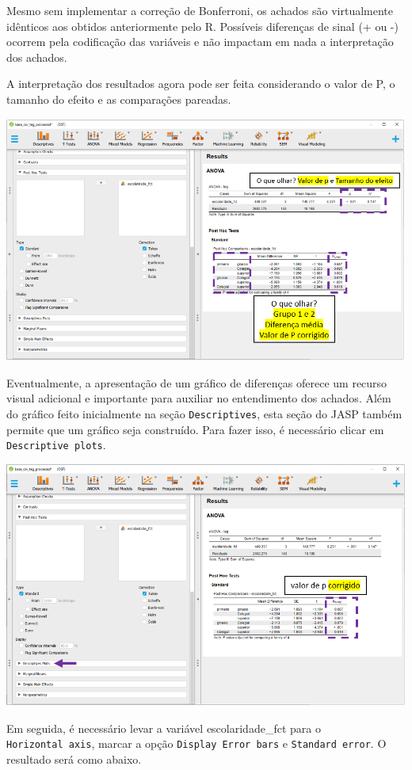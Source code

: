 \documentclass[
]{book}
\begin{document}
Mesmo sem implementar a correção de Bonferroni, os achados são virtualmente idênticos aos obtidos anteriormente pelo R. Possíveis diferenças de sinal (+ ou -) ocorrem pela codificação das variáveis e não impactam em nada a interpretação dos achados.

A interpretação dos resultados agora pode ser feita considerando o valor de P, o tamanho do efeito e as comparações pareadas.

\includegraphics{./img/cap_anova_posthoc_resultados2.png}

Eventualmente, a apresentação de um gráfico de diferenças oferece um recurso visual adicional e importante para auxiliar no entendimento dos achados. Além do gráfico feito inicialmente na seção \texttt{Descriptives}, esta seção do JASP também permite que um gráfico seja construído. Para fazer isso, é necessário clicar em \texttt{Descriptive\ plots}.

\includegraphics{./img/cap_anova_posthoc_plots.png}

Em seguida, é necessário levar a variável escolaridade\_fct para o \texttt{Horizontal\ axis}, marcar a opção \texttt{Display\ Error\ bars} e \texttt{Standard\ error}. O resultado será como abaixo.
\end{document}
